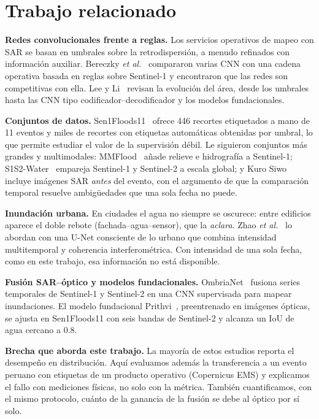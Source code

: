 \section{Trabajo relacionado}
\label{sec:relacionado}

\textbf{Redes convolucionales frente a reglas.} Los servicios operativos de mapeo con SAR se
basan en umbrales sobre la retrodispersión, a menudo refinados con información auxiliar.
Bereczky \emph{et al.}~\cite{bereczky2022benchmarking} compararon varias CNN con una cadena
operativa basada en reglas sobre Sentinel-1 y encontraron que las redes son competitivas con
ella. Lee y Li~\cite{lee2025geoai} revisan la evolución del área, desde los umbrales hasta las
CNN tipo codificador--decodificador y los modelos fundacionales.

\textbf{Conjuntos de datos.} Sen1Floods11~\cite{bonafilia2020sen1floods11} ofrece 446 recortes
etiquetados a mano de 11 eventos y miles de recortes con etiquetas automáticas obtenidas por
umbral, lo que permite estudiar el valor de la supervisión débil. Le siguieron conjuntos más
grandes y multimodales: MMFlood~\cite{montello2022mmflood} añade relieve e hidrografía a
Sentinel-1; S1S2-Water~\cite{wieland2024s1s2water} empareja Sentinel-1 y Sentinel-2 a escala
global; y Kuro Siwo~\cite{bountos2024kurosiwo} incluye imágenes SAR \emph{antes} del evento, con
el argumento de que la comparación temporal resuelve ambigüedades que una sola fecha no puede.

\textbf{Inundación urbana.} En ciudades el agua no siempre se oscurece: entre edificios aparece
el doble rebote (fachada--agua--sensor), que la \emph{aclara}. Zhao \emph{et
al.}~\cite{zhao2022urbanaware} lo abordan con una U-Net consciente de lo urbano que combina
intensidad multitemporal y coherencia interferométrica. Con intensidad de una sola fecha, como
en este trabajo, esa información no está disponible.

\textbf{Fusión SAR--óptico y modelos fundacionales.} OmbriaNet~\cite{drakonakis2022ombrianet}
fusiona series temporales de Sentinel-1 y Sentinel-2 en una CNN supervisada para mapear
inundaciones.
El modelo fundacional Prithvi~\cite{jakubik2023prithvi}, preentrenado en imágenes ópticas, se
ajusta en Sen1Floods11 con seis bandas de Sentinel-2 y alcanza un IoU de agua cercano a 0.8.

\textbf{Brecha que aborda este trabajo.} La mayoría de estos estudios reporta el desempeño en
distribución. Aquí evaluamos además la transferencia a un evento peruano con etiquetas de un
producto operativo (Copernicus EMS) y explicamos el fallo con mediciones físicas, no solo con la
métrica. También cuantificamos, con el mismo protocolo, cuánto de la ganancia de la fusión se
debe al óptico por sí solo.
